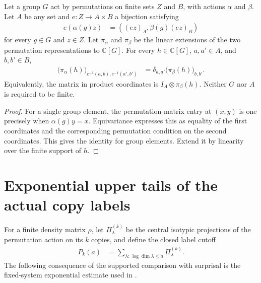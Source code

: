 \begin{theorem}
\label{thm:group_algebra_product_coordinates}
    \leanok
Let a group $G$ act by permutations on finite sets $Z$ and $B$, with
actions $\alpha$ and $\beta$. Let $A$ be any set and
$e:Z\to A\times B$ a bijection satisfying
\begin{align}
 e(\alpha(g)z)&=((ez)_A,\beta(g)(ez)_B)
\end{align}
for every $g\in G$ and $z\in Z$. Let $\pi_\alpha$ and $\pi_\beta$ be
the linear extensions of the two permutation representations to
$\mathbb C[G]$. For every $h\in\mathbb C[G]$, $a,a'\in A$, and
$b,b'\in B$,
\begin{align}
 \bigl(\pi_\alpha(h)\bigr)_{e^{-1}(a,b),e^{-1}(a',b')}
   &=\delta_{a,a'}\bigl(\pi_\beta(h)\bigr)_{b,b'}.
\end{align}
Equivalently, the matrix in product coordinates is
$I_A\otimes\pi_\beta(h)$. Neither $G$ nor $A$ is required to be finite.
\end{theorem}
\begin{proof}
    \leanok
For a single group element, the permutation-matrix entry at $(x,y)$ is
one precisely when $\alpha(g)y=x$. Equivariance expresses this as
equality of the first coordinates and the corresponding permutation
condition on the second coordinates. This gives the identity for group
elements. Extend it by linearity over the finite support of $h$.
\end{proof}

\section{Exponential upper tails of the actual copy labels}
\label{sec:iid_schur_label_exponential}

For a finite density matrix $\rho$, let $\Pi^{(k)}_\lambda$ be the
central isotypic projections of the permutation action on its $k$ copies,
and define the closed label cutoff
\begin{align}
 P_k(a)&=\sum_{\lambda:\,\log\dim\lambda\le a}\Pi^{(k)}_\lambda.
\end{align}
The following consequence of the supported comparison with surprisal is
the fixed-system exponential estimate used in
\cite[Section~7]{OpenAI2026AreaLaw}.

